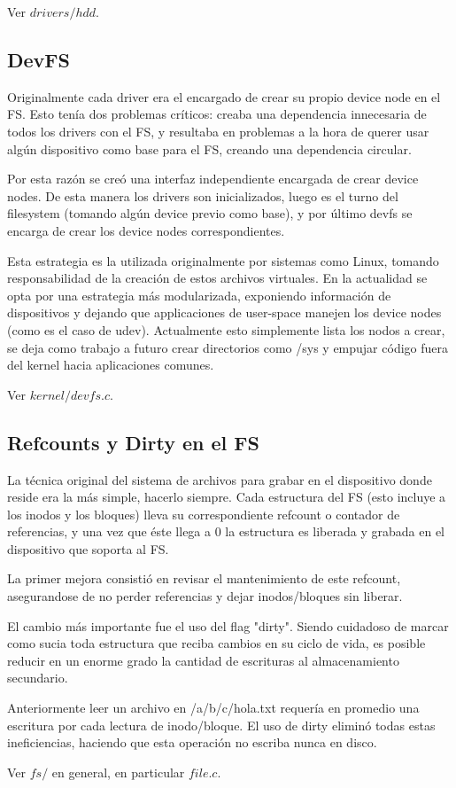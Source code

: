 Ver $drivers/hdd$.

\subsection{DevFS}

Originalmente cada driver era el encargado de crear su propio device node en el
FS. Esto tenía dos problemas críticos: creaba una dependencia innecesaria de todos
los drivers con el FS, y resultaba en problemas a la hora de querer usar algún
dispositivo como base para el FS, creando una dependencia circular.

Por esta razón se creó una interfaz independiente encargada de crear device
nodes. De esta manera los drivers son inicializados, luego es el turno del
filesystem (tomando algún device previo como base), y por último devfs se
encarga de crear los device nodes correspondientes.

Esta estrategia es la utilizada originalmente por sistemas como Linux, tomando
responsabilidad de la creación de estos archivos virtuales. En la actualidad se
opta por una estrategia más modularizada, exponiendo información de dispositivos
y dejando que applicaciones de user-space manejen los device nodes (como es el
caso de udev). Actualmente esto simplemente lista los nodos a crear, se deja como
trabajo a futuro crear directorios como /sys y empujar código fuera del kernel
hacia aplicaciones comunes.

Ver $kernel/devfs.c$.

\subsection{Refcounts y Dirty en el FS}

La técnica original del sistema de archivos para grabar en el dispositivo donde
reside era la más simple, hacerlo siempre. Cada estructura del FS (esto incluye
a los inodos y los bloques) lleva su correspondiente refcount o contador de
referencias, y una vez que éste llega a 0 la estructura es liberada y grabada en
el dispositivo que soporta al FS.

La primer mejora consistió en revisar el mantenimiento de este refcount,
asegurandose de no perder referencias y dejar inodos/bloques sin liberar.

El cambio más importante fue el uso del flag "dirty". Siendo cuidadoso de marcar como
sucia toda estructura que reciba cambios en su ciclo de vida, es posible reducir
en un enorme grado la cantidad de escrituras al almacenamiento secundario.

Anteriormente leer un archivo en /a/b/c/hola.txt requería en promedio
una escritura por cada lectura de inodo/bloque. El uso de dirty eliminó todas
estas ineficiencias, haciendo que esta operación no escriba nunca en disco.

Ver $fs/$ en general, en particular $file.c$.
